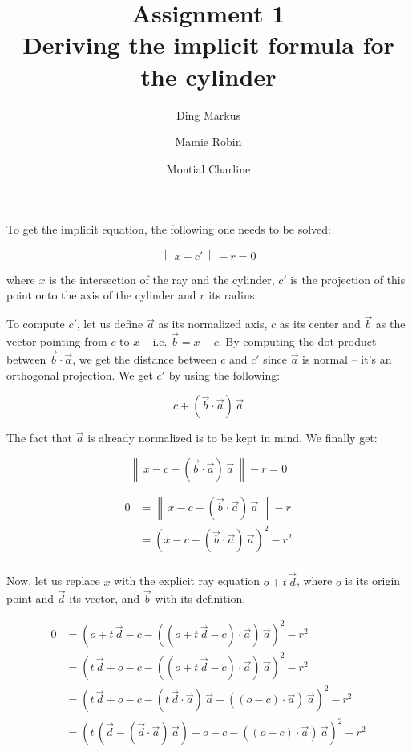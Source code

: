 \documentclass{article}
\title{{\Huge \textbf{Assignment 1}}\\
Deriving the implicit formula for the cylinder}
\author{Ding Markus \and Mamie Robin \and Montial Charline}
\newcommand{\norm}[1]{\left\lVert\,#1\,\right\rVert}
\begin{document}
    \maketitle
    
    To get the implicit equation, the following one needs to be solved:
    
    \[ \norm{x - c'} - r = 0 \]
    
    where $x$ is the intersection of the ray and the cylinder, $c'$ is the projection of this point onto the axis of the cylinder and $r$ its radius.
    
    To compute $c'$, let us define $\vec{a}$ as its normalized axis, $c$ as its center and $\vec{b}$ as the vector pointing from $c$ to $x$ -- i.e. $\vec{b} = x - c$.
    By computing the dot product between $\vec{b} \cdot \vec{a}$, we get the distance between $c$ and $c'$ since $\vec{a}$ is normal -- it's an orthogonal projection.
    We get $c'$ by using the following:
    
    \[ c + (\vec{b} \cdot \vec{a}) \, \vec{a} \]
    
    The fact that $\vec{a}$ is already normalized is to be kept in mind.
    We finally get:
    
    \[ \norm{x - c - (\vec{b} \cdot \vec{a}) \, \vec{a}} - r = 0 \]
    
    \begin{align*}
        0 &= \norm{x - c - (\vec{b} \cdot \vec{a}) \, \vec{a}} - r\\
        &= \left(x - c - (\vec{b} \cdot \vec{a}) \, \vec{a}\right)^2 - r^2\\
    \end{align*}
    
    Now, let us replace $x$ with the explicit ray equation $o + t \, \vec{d}$, where $o$ is its origin point and $\vec{d}$ its vector, and $\vec{b}$ with its definition.
    
    \begin{align*}
        0 &= \left(o + t \, \vec{d} - c - ((o + t \, \vec{d} - c) \cdot \vec{a}) \, \vec{a}\right)^2 - r^2\\
        &= \left(t \, \vec{d} + o - c - ((o + t \, \vec{d} - c) \cdot \vec{a}) \, \vec{a}\right)^2 - r^2\\
        &= \left(t \, \vec{d} + o - c - (t \, \vec{d} \cdot \vec{a}) \, \vec{a} - ((o - c) \cdot \vec{a}) \, \vec{a}\right)^2 - r^2\\
        &= \left(t \, (\vec{d} - (\vec{d} \cdot \vec{a}) \, \vec{a}) + o - c - ((o - c) \cdot \vec{a}) \, \vec{a}\right)^2 - r^2
    \end{align*}
    
\end{document}
